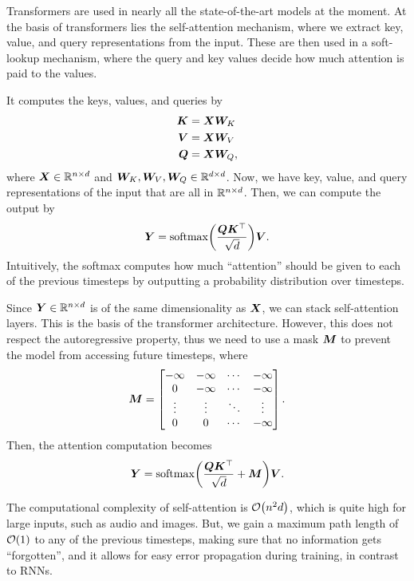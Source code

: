Transformers \citep{vaswani2017attention} are used in nearly all the state-of-the-art models at the
moment. At the basis of transformers lies the self-attention mechanism, where we extract key,
value, and query representations from the input. These are then used in a soft-lookup mechanism,
where the query and key values decide how much attention is paid to the values.

It computes the keys, values, and queries by
\begin{align*}
    \bm{K} & = \bm{X} \bm{W}_K  \\
    \bm{V} & = \bm{X} \bm{W}_V  \\
    \bm{Q} & = \bm{X} \bm{W}_Q,
\end{align*}
where $\bm{X} \in \mathbb{R}^{n\times d}$ and $\bm{W}_K,\bm{W}_V,\bm{W}_Q \in \mathbb{R}^{d\times d}$. Now, we have
key, value, and query representations of the input that are all in $\mathbb{R}^{n \times d}$. Then, we can
compute the output by \[
    \mat{Y} = \mathrm{softmax}\lft( \frac{\mat{Q} \transpose{\mat{K}}}{\sqrt{d}} \rgt) \mat{V}.
\]
Intuitively, the softmax computes how much ``attention'' should be given to each of the previous
timesteps by outputting a probability distribution over timesteps.

Since $\bm{Y} \in \mathbb{R}^{n \times d}$ is of the same dimensionality as $\bm{X}$, we can stack
self-attention layers. This is the basis of the transformer architecture. However, this does not
respect the autoregressive property, thus we need to use a mask $\bm{M}$ to prevent the model from
accessing future timesteps, where \[
    \bm{M} = \begin{bmatrix}
        -\infty & -\infty & \cdots & -\infty \\
        0       & -\infty & \cdots & -\infty \\
        \vdots  & \vdots  & \ddots & \vdots  \\
        0       & 0       & \cdots & -\infty
    \end{bmatrix}.
\]
Then, the attention computation becomes \[
    \mat{Y} = \mathrm{softmax}\lft( \frac{\mat{Q} \transpose{\mat{K}}}{\sqrt{d}} + \mat{M} \rgt) \mat{V}.
\]

The computational complexity of self-attention is $\bigo{n^2 d}$, which is quite high for large
inputs, such as audio and images. But, we gain a maximum path length of $\bigo{1}$ to any of the
previous timesteps, making sure that no information gets ``forgotten'', and it allows for easy
error propagation during training, in contrast to RNNs.

